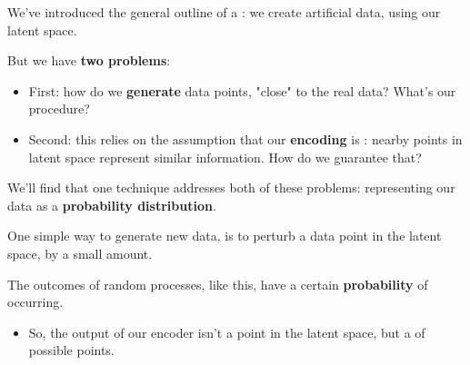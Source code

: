             We've introduced the general outline of a : we create artificial data, using our latent space.

            But we have \textbf{two problems}:

            \begin{itemize}
                \item First: how do we \textbf{generate}  data points, "close" to the real data? What's our procedure? 
                
                \item Second: this relies on the assumption that our \textbf{encoding} is : nearby points in latent space represent similar information. How do we guarantee that?
            \end{itemize}

            We'll find that one technique addresses both of these problems: representing our data as a \textbf{probability distribution}.
            
            \subsecdiv

            One simple way to generate new data, is to  perturb a data point in the latent space, by a small amount.

            The outcomes of random processes, like this, have a certain \textbf{probability} of occurring.
                \begin{itemize}
                    \item So, the output of our encoder isn't a point in the latent space, but a  of possible points.\\
                \end{itemize}

